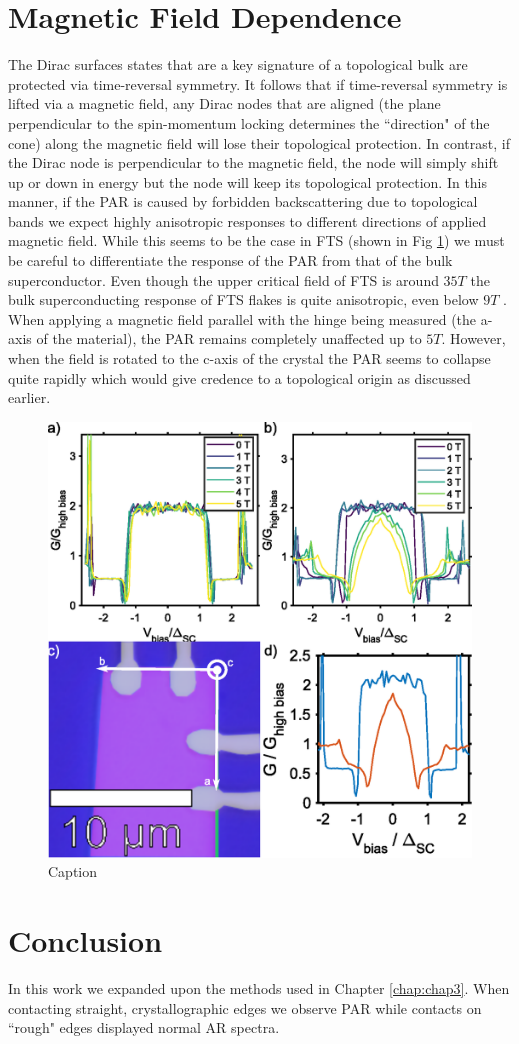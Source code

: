 \section{Magnetic Field Dependence}
The Dirac surfaces states that are a key signature of a topological bulk are protected via time-reversal symmetry. It follows that if time-reversal symmetry is lifted via a magnetic field, any Dirac nodes that are aligned (the plane perpendicular to the spin-momentum locking determines the ``direction" of the cone) along the magnetic field will lose their topological protection. In contrast, if the Dirac node is perpendicular to the magnetic field, the node will simply shift up or down in energy but the node will keep its topological protection. In this manner, if the \ac{PAR} is caused by forbidden backscattering due to topological bands we expect highly anisotropic responses to different directions of applied magnetic field. While this seems to be the case in \ac{FTS} (shown in Fig \ref{fig:PARField}) we must be careful to differentiate the response of the \ac{PAR} from that of the bulk superconductor. Even though the upper critical field of \ac{FTS} is around $35 T$  the bulk superconducting response of \ac{FTS} flakes is quite anisotropic, even below $9 T$ \cite{zalic2019}. When applying a magnetic field parallel with the hinge being measured (the a-axis of the material), the \ac{PAR} remains completely unaffected up to $5 T$. However, when the field is rotated to the c-axis of the crystal the \ac{PAR} seems to collapse quite rapidly which would give credence to a topological origin as discussed earlier. 
\begin{figure}[h]
    \centering
    \includegraphics[width = \textwidth]{Chap4/Figures/MagneticField.eps}
    \caption{Caption}
    \label{fig:PARField}
\end{figure}
\section{Conclusion}
In this work we expanded upon the methods used in Chapter \ref{chap:chap3}. When contacting straight, crystallographic edges we observe \acl{PAR} while contacts on ``rough" edges displayed normal \acl{AR} spectra. 